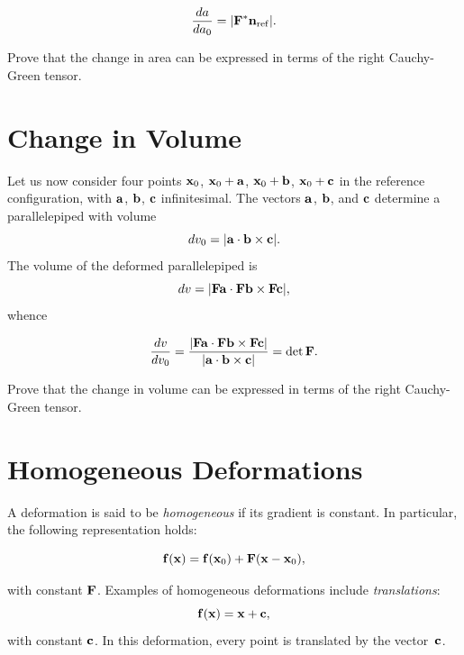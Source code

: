 \begin{definition}
	\begin{equation}
	\frac{da}{da_0}=|\mathbf{F}^*\mathbf{n}_{\rm ref}|.
\end{equation}
\end{definition}

\begin{exercise}
Prove that the change in area can be expressed in terms of the right Cauchy-Green tensor.
\end{exercise}

\section{Change in Volume}  
Let us now consider four points $\mathbf{x}_0$, $\mathbf{x}_0+\mathbf{a}$, $\mathbf{x}_0+\mathbf{b}$, $\mathbf{x}_0+\mathbf{c}$ in the reference configuration, with $\mathbf{a}$, $\mathbf{b}$, $\mathbf{c}$ infinitesimal. The vectors $\mathbf{a}$, $\mathbf{b}$, and $\mathbf{c}$  determine a parallelepiped with volume
\begin{equation}
dv_0=|\mathbf{a} \cdot \mathbf{b} \times \mathbf{c}|.
\end{equation} 
The volume of the deformed parallelepiped is
\begin{equation}
dv=|\mathbf{F}\mathbf{a} \cdot \mathbf{F}\mathbf{b} \times \mathbf{F}\mathbf{c}|,
\end{equation}
whence
\begin{definition}
	\begin{equation}
\frac{dv}{dv_0}=\frac{|\mathbf{F}\mathbf{a} \cdot \mathbf{F}\mathbf{b} \times \mathbf{F}\mathbf{c}|}{|\mathbf{a} \cdot \mathbf{b} \times \mathbf{c}|}=\det \mathbf{F}.
\end{equation}
\end{definition}

\begin{exercise}
	Prove that the change in volume can be expressed in terms of the right Cauchy-Green tensor.
\end{exercise}

\section{Homogeneous Deformations}

A deformation is said to be \textit{homogeneous} if its gradient is constant. In particular, the following representation holds:

\begin{definition}
	\begin{equation}
		\mathbf{f}(\mathbf{x})=\mathbf{f}(\mathbf{x}_0)+\mathbf{F}(\mathbf{x}-\mathbf{x}_0),
	\end{equation}
\end{definition}
with constant $\mathbf{F}$. Examples of homogeneous deformations include \textit{translations}:
\begin{equation}
	\mathbf{f}(\mathbf{x})=\mathbf{x} +\mathbf{c},
\end{equation}
with constant $\mathbf{c}$. In this deformation, every point is translated by the vector~$\mathbf{c}$.

